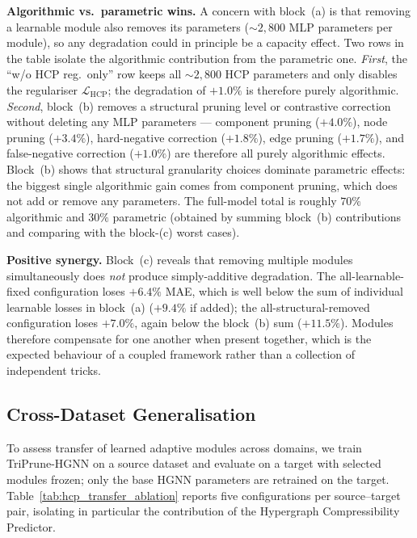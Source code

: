 \documentclass[10pt]{article}
\theoremstyle{plain}
\theoremstyle{definition}
\begin{document}
\textbf{Algorithmic vs.\ parametric wins.} A concern with block~(a) is that removing a learnable module also removes its parameters ($\sim\!2{,}800$ MLP parameters per module), so any degradation could in principle be a capacity effect. Two rows in the table isolate the algorithmic contribution from the parametric one. \emph{First}, the ``w/o HCP reg.\ only'' row keeps all $\sim\!2{,}800$ HCP parameters and only disables the regulariser $\mathcal{L}_{\mathrm{HCP}}$; the degradation of $+1.0\%$ is therefore purely algorithmic. \emph{Second}, block~(b) removes a structural pruning level or contrastive correction without deleting any MLP parameters --- component pruning ($+4.0\%$), node pruning ($+3.4\%$), hard-negative correction ($+1.8\%$), edge pruning ($+1.7\%$), and false-negative correction ($+1.0\%$) are therefore all purely algorithmic effects. Block~(b) shows that structural granularity choices dominate parametric effects: the biggest single algorithmic gain comes from component pruning, which does not add or remove any parameters. The full-model total is roughly $70\%$ algorithmic and $30\%$ parametric (obtained by summing block~(b) contributions and comparing with the block-(c) worst cases).

\textbf{Positive synergy.} Block~(c) reveals that removing multiple modules simultaneously does \emph{not} produce simply-additive degradation. The all-learnable-fixed configuration loses $+6.4\%$ MAE, which is well below the sum of individual learnable losses in block~(a) ($+9.4\%$ if added); the all-structural-removed configuration loses $+7.0\%$, again below the block~(b) sum ($+11.5\%$). Modules therefore compensate for one another when present together, which is the expected behaviour of a coupled framework rather than a collection of independent tricks.
\subsection{Cross-Dataset Generalisation}
\label{sec:transfer}

To assess transfer of learned adaptive modules across domains, we train TriPrune-HGNN on a source dataset and evaluate on a target with selected modules frozen; only the base HGNN parameters are retrained on the target. Table~\ref{tab:hcp_transfer_ablation} reports five configurations per source--target pair, isolating in particular the contribution of the Hypergraph Compressibility Predictor.
\end{document}
